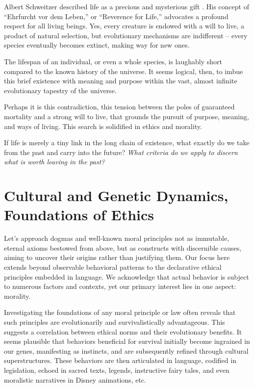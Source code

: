 \documentclass[11pt,a4]{article}
\begin{document}
\hspace{5mm}
\par

Albert Schweitzer described life as a precious and mysterious gift \cite{Schweitzer}. His concept of “Ehrfurcht vor dem Leben,” or “Reverence for Life,” advocates a profound respect for all living beings. Yes, every creature is endowed with a will to live, a product of natural selection, but evolutionary mechanisms are indifferent – every species eventually becomes extinct, making way for new ones.
\par
The lifespan of an individual, or even a whole species, is laughably short compared to the known history of the universe. It seems logical, then, to imbue this brief existence with meaning and purpose within the vast, almost infinite evolutionary tapestry of the universe.
\par
Perhaps it is this contradiction, this tension between the poles of guaranteed mortality and a strong will to live, that grounds the pursuit of purpose, meaning, and ways of living. This search is solidified in ethics and morality.

\par
If life is merely a tiny link in the long chain of existence, what exactly do we take from the past and carry into the future? \textit{What criteria do we apply to discern what is worth leaving in the past?}


\section{Cultural and Genetic Dynamics, Foundations of Ethics
}
Let's approach dogmas and well-known moral principles not as immutable, eternal axioms bestowed from above, but as constructs with discernible causes, aiming to uncover their origins rather than justifying them. Our focus here extends beyond observable behavioral patterns to the declarative ethical principles embedded in language. We acknowledge that actual behavior is subject to numerous factors and contexts, yet our primary interest lies in one aspect: morality.

\par
Investigating the foundations of any moral principle or law often reveals that such principles are evolutionarily and survivalistically advantageous. This suggests a correlation between ethical norms and their evolutionary benefits. It seems plausible that behaviors beneficial for survival initially become ingrained in our genes, manifesting as instincts, and are subsequently refined through cultural superstructures. These behaviors are then articulated in language, codified in legislation, echoed in sacred texts, legends, instructive fairy tales, and even moralistic narratives in Disney animations, etc.
\end{document}
